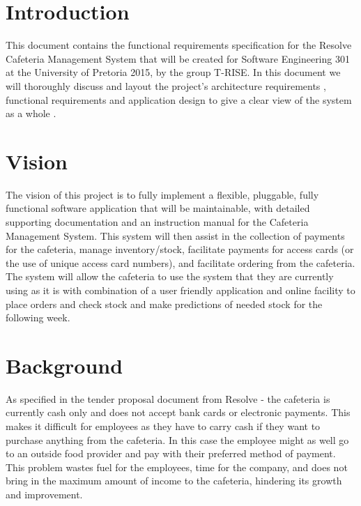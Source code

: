 \documentclass[12pt]{article}
\begin{document}
\maketitle
\break

\tableofcontents
\break


\section{Introduction}
This document contains the functional requirements specification for the Resolve Cafeteria Management System that will be created for Software Engineering 301 at the University of Pretoria 2015, by the group T-RISE. In this document we will thoroughly discuss and layout the project's architecture requirements , functional requirements and application design to give a clear view of the system as a whole . 

\section{Vision}
The vision of this project is to fully implement a flexible, pluggable, fully functional software application that will be maintainable, with detailed supporting documentation and an instruction manual for the Cafeteria Management System. This system will then assist in the collection of payments for the cafeteria, manage inventory/stock, facilitate payments for access cards (or the use of unique access card numbers), and facilitate ordering from the cafeteria. The system will allow the cafeteria to use the system that they are currently using as it is with combination of a user friendly application and online facility to place orders and check stock and make predictions of needed stock for the following week.

\section{Background}
As specified in the tender proposal document from Resolve - the cafeteria is currently cash only and does not accept bank cards or electronic payments. This makes it difficult for employees as they have to carry cash if they want to purchase anything from the cafeteria. In this case the employee might as well go to an outside food provider and
pay with their preferred method of payment. This problem wastes fuel for the employees, time for the company, and does not bring in the maximum amount of income to the cafeteria, hindering its growth and improvement.\\
\end{document}
